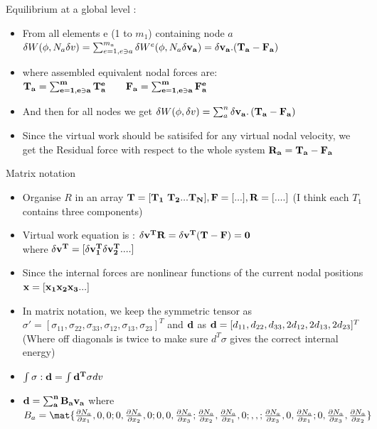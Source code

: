 
 	\begin{frame}
 		Equilibrium at a global level :
 		\begin{itemize}
 			\item From all elements e (1 to $m_1$) containing node $a$ \\
 			$\delta W(\phi,N_a \delta v) = \sum_{e=1,e \ni a}^{m_a} \delta W^e(\phi,N_a \delta \mathbf{v_a}) = \delta \mathbf{v_a . (T_a-F_a)}$ 	
 			\item where assembled equivalent nodal forces are:		
 			$\mathbf{T_a =\sum_{e=1,e \ni a}^{m} T_a^e \qquad F_a =\sum_{e=1,e \ni a}^{m} F_a^e  }$
 			\item And then for all nodes we get
 			$\delta W(\phi,\delta v) = \sum_{a}^{n} \mathbf{\delta v_a . \left(T_a -F_a \right)}$
 			\item Since the virtual work should be satisifed for any virtual nodal velocity, we get the Residual force with respect to the whole system
 			$\mathbf{R_a = T_a - F_a}$
 		\end{itemize}
 	\end{frame}
 
 	\begin{frame}{Matrix notation}
 		\begin{itemize}
 			\item Organise $R$ in an array $\mathbf{T=[T_1~T_2...T_N],F = [...] ,R = [....]}$ (I think each $T_1$ contains three components)
 			\item Virtual work equation is : $ \mathbf{\delta v^TR = \delta v^T(T-F) = 0}$\\
 			where $\mathbf{\delta v^T = [\delta v_1^T \delta v_2^T....]}$
 			\item Since the internal forces are nonlinear functions of the current nodal positions $\mathbf{x = [x_1 x_2 x_3 ...]}$
 			\item In matrix notation, we keep the symmetric tensor as $\sigma' = [ \sigma_{11},\sigma_{22},\sigma_{33},\sigma_{12},\sigma_{13},\sigma_{23}]^T$ and $\mathbf{d}$ as $\mathbf{d} = [ d_{11},d_{22},d_{33},2d_{12},2d_{13},2d_{23}]^T$ (Where off diagonals is twice to make sure $d^T \sigma$ gives the correct internal energy)
 			\item $\mathbf{\int \sigma:d = \int d^T\sigma }dv$
 			\item $\mathbf{d = \sum_{a}^{n}B_av_a}$ where $B_a = \mat{\frac{\partial N_a}{\partial x_1},0,0; 0,\frac{\partial N_a}{\partial x_2},0;0,0,\frac{\partial N_a}{\partial x_3};
 				\frac{\partial N_a}{\partial x_2},\frac{\partial N_a}{\partial x_1},0; , , ;
 				\frac{\partial N_a}{\partial x_3},0,\frac{\partial N_a}{\partial x_1};
 				0,\frac{\partial N_a}{\partial x_3},\frac{\partial N_a}{\partial x_2}}$

 		\end{itemize}
 	\end{frame}
 
